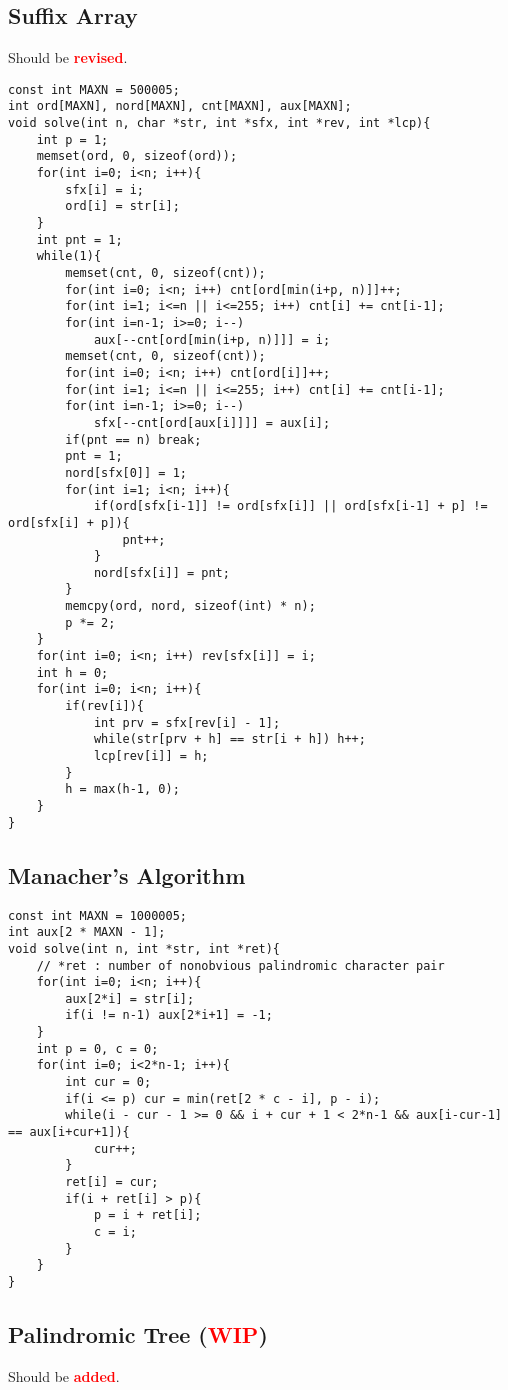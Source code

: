 \documentclass[landscape, 8pt, a4paper, oneside,  twocolumn]{extarticle}
\newcommand{\revised}{Should be \textcolor{red}{\textbf{revised}}.}
\newcommand{\added}{Should be \textcolor{red}{\textbf{added}}.}
\newcommand{\WIP}{\textcolor{red}{\textbf{WIP}}}
\begin{document}
\subsection{Suffix Array}
\revised %
\begin{verbatim}
const int MAXN = 500005;
int ord[MAXN], nord[MAXN], cnt[MAXN], aux[MAXN];
void solve(int n, char *str, int *sfx, int *rev, int *lcp){
	int p = 1;
	memset(ord, 0, sizeof(ord));
	for(int i=0; i<n; i++){
		sfx[i] = i;
		ord[i] = str[i];
	}
	int pnt = 1;
	while(1){
		memset(cnt, 0, sizeof(cnt));
		for(int i=0; i<n; i++) cnt[ord[min(i+p, n)]]++;
		for(int i=1; i<=n || i<=255; i++) cnt[i] += cnt[i-1];
		for(int i=n-1; i>=0; i--) 
			aux[--cnt[ord[min(i+p, n)]]] = i;
		memset(cnt, 0, sizeof(cnt));
		for(int i=0; i<n; i++) cnt[ord[i]]++;
		for(int i=1; i<=n || i<=255; i++) cnt[i] += cnt[i-1];
		for(int i=n-1; i>=0; i--) 
			sfx[--cnt[ord[aux[i]]]] = aux[i];
		if(pnt == n) break;
		pnt = 1;
		nord[sfx[0]] = 1;
		for(int i=1; i<n; i++){
			if(ord[sfx[i-1]] != ord[sfx[i]] || ord[sfx[i-1] + p] != ord[sfx[i] + p]){
				pnt++;
			}
			nord[sfx[i]] = pnt;
		}
		memcpy(ord, nord, sizeof(int) * n);
		p *= 2;
	}
	for(int i=0; i<n; i++) rev[sfx[i]] = i;
	int h = 0;
	for(int i=0; i<n; i++){
		if(rev[i]){
			int prv = sfx[rev[i] - 1];
			while(str[prv + h] == str[i + h]) h++;
			lcp[rev[i]] = h;
		}
		h = max(h-1, 0);
	}
}
\end{verbatim}
\subsection{Manacher's Algorithm}
\begin{verbatim}
const int MAXN = 1000005;
int aux[2 * MAXN - 1];
void solve(int n, int *str, int *ret){
	// *ret : number of nonobvious palindromic character pair 
	for(int i=0; i<n; i++){
		aux[2*i] = str[i];
		if(i != n-1) aux[2*i+1] = -1;
	}
	int p = 0, c = 0;
	for(int i=0; i<2*n-1; i++){
		int cur = 0;
		if(i <= p) cur = min(ret[2 * c - i], p - i);
		while(i - cur - 1 >= 0 && i + cur + 1 < 2*n-1 && aux[i-cur-1] == aux[i+cur+1]){
			cur++;
		}
		ret[i] = cur;
		if(i + ret[i] > p){
			p = i + ret[i];
			c = i;
		}
	}
}
\end{verbatim}

\subsection{Palindromic Tree (\WIP)}
\added
\end{document}
